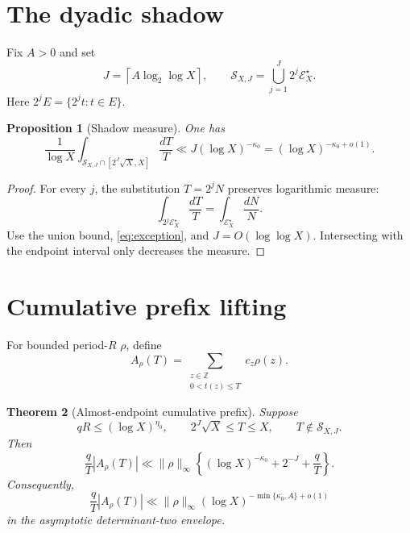 \documentclass[11pt]{article}
\newtheorem{theorem}{Theorem}[section]
\newtheorem{proposition}[theorem]{Proposition}
\theoremstyle{definition}
\newcommand{\E}{\mathcal E}
\newcommand{\Sshadow}{\mathcal S}
\newcommand{\norm}[1]{\lVert#1\rVert}
\begin{document}
\section{The dyadic shadow}

Fix \(A>0\) and set
\begin{equation}
 J=\left\lceil A\log_2\log X\right\rceil,\qquad
 \Sshadow_{X,J}=\bigcup_{j=1}^J2^j\E_X^\star.
\label{eq:shadow}
\end{equation}
Here \(2^jE=\{2^jt:t\in E\}\).

\begin{proposition}[Shadow measure]\label{prop:measure}
One has
\begin{equation}
 \frac1{\log X}
 \int_{\Sshadow_{X,J}\cap[2^J\sqrt X,X]}\frac{dT}{T}
 \ll J(\log X)^{-\kappa_0}
 =(\log X)^{-\kappa_0+o(1)}.
\label{eq:shadowmeasure}
\end{equation}
\end{proposition}

\begin{proof}
For every \(j\), the substitution \(T=2^jN\) preserves logarithmic
measure:
\[
 \int_{2^j\E_X^\star}\frac{dT}{T}
 =\int_{\E_X^\star}\frac{dN}{N}.
\]
Use the union bound, \eqref{eq:exception}, and
\(J=O(\log\log X)\).  Intersecting with the endpoint interval only
decreases the measure.
\end{proof}

\section{Cumulative prefix lifting}

For bounded period-\(R\) \(\rho\), define
\[
 A_\rho(T)=
 \sum_{\substack{z\in\mathbb Z\\0<t(z)\le T}}c_z\rho(z).
\]

\begin{theorem}[Almost-endpoint cumulative prefix]\label{thm:main}
Suppose
\[
 qR\le(\log X)^{\eta_0},\qquad
 2^J\sqrt X\le T\le X,\qquad
 T\notin\Sshadow_{X,J}.
\]
Then
\begin{equation}
 \boxed{\;
 \frac qT|A_\rho(T)|
 \ll\norm{\rho}_\infty
 \left\{(\log X)^{-\kappa_0}+2^{-J}+\frac qT\right\}.\;}
\label{eq:main}
\end{equation}
Consequently,
\[
 \frac qT|A_\rho(T)|
 \ll\norm{\rho}_\infty
 (\log X)^{-\min\{\kappa_0,A\}+o(1)}
\]
in the asymptotic determinant-two envelope.
\end{theorem}
\end{document}

